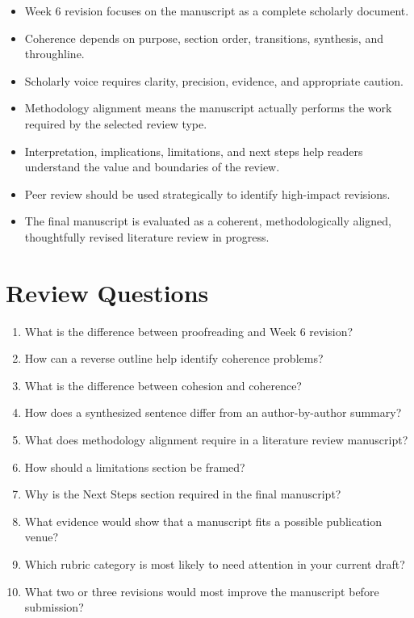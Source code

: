 \documentclass[11pt]{article}
\begin{document}
\begin{itemize}
  \item Week 6 revision focuses on the manuscript as a complete scholarly document.
  \item Coherence depends on purpose, section order, transitions, synthesis, and throughline.
  \item Scholarly voice requires clarity, precision, evidence, and appropriate caution.
  \item Methodology alignment means the manuscript actually performs the work required by the selected review type.
  \item Interpretation, implications, limitations, and next steps help readers understand the value and boundaries of the review.
  \item Peer review should be used strategically to identify high-impact revisions.
  \item The final manuscript is evaluated as a coherent, methodologically aligned, thoughtfully revised literature review in progress.
\end{itemize}

\section{Review Questions}

\begin{enumerate}
  \item What is the difference between proofreading and Week 6 revision?
  \item How can a reverse outline help identify coherence problems?
  \item What is the difference between cohesion and coherence?
  \item How does a synthesized sentence differ from an author-by-author summary?
  \item What does methodology alignment require in a literature review manuscript?
  \item How should a limitations section be framed?
  \item Why is the Next Steps section required in the final manuscript?
  \item What evidence would show that a manuscript fits a possible publication venue?
  \item Which rubric category is most likely to need attention in your current draft?
  \item What two or three revisions would most improve the manuscript before submission?
\end{enumerate}
\end{document}
